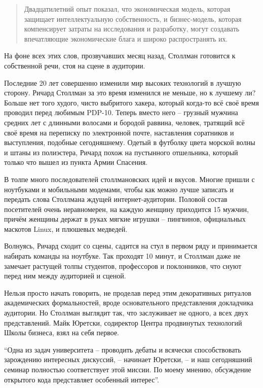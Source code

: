 \begin{quote}
Двадцатилетний опыт показал, что экономическая модель, которая защищает интеллектуальную собственность, и бизнес-модель, которая компенсирует затраты на исследования и разработку, могут создавать впечатляющие экономические блага и широко распространять их.
\end{quote}

На фоне всех этих слов, прозвучавших месяц назад, Столлман готовится к собственной речи, стоя на сцене в аудитории.

Последние 20 лет совершенно изменили мир высоких технологий в лучшую сторону. Ричард Столлман за это время изменился не меньше, но к лучшему ли? Больше нет того худого, чисто выбритого хакера, который когда-то всё своё время проводил перед любимым PDP-10. Теперь вместо него -- грузный мужчина средних лет с длинными волосами и бородой раввина, человек, тратящий всё своё время на переписку по электронной почте, наставления соратников и выступления, подобные сегодняшнему. Одетый в футболку цвета морской волны и штаны из полиэстера, Ричард похож на пустынного отшельника, который только что вышел из пункта Армии Спасения.

В толпе много последователей столлмановских идей и вкусов. Многие пришли с ноутбуками и мобильными модемами, чтобы как можно лучше записать и передать слова Столлмана ждущей интернет-аудитории. Половой состав посетителей очень неравномерен, на каждую женщину приходится 15 мужчин, причём женщины держат в руках мягкие игрушки -- пингвинов, официальных маскотов Linux, и плюшевых медведей.

Волнуясь, Ричард сходит со сцены, садится на стул в первом ряду и принимается набирать команды на ноутбуке. Так проходят 10 минут, и Столлман даже не замечает растущей толпы студентов, профессоров и поклонников, что снуют перед ним между аудиторией и сценой.

Нельзя просто начать говорить, не проделав перед этим декоративных ритуалов академических формальностей, вроде основательного представления докладчика аудитории. Но Столлман выглядит так, что заслуживает не одного, а всех двух представлений. Майк Юретски, содиректор Центра продвинутых технологий Школы бизнеса, взял на себя первое. 

\enquote{Одна из задач университета -- проводить дебаты и всячески способствовать зарождению интересных дискуссий, -- начинает Юретски, -- и наш сегодняшний семинар полностью соответствует этой миссии. По моему мнению, обсуждение открытого кода представляет особенный интерес}.

